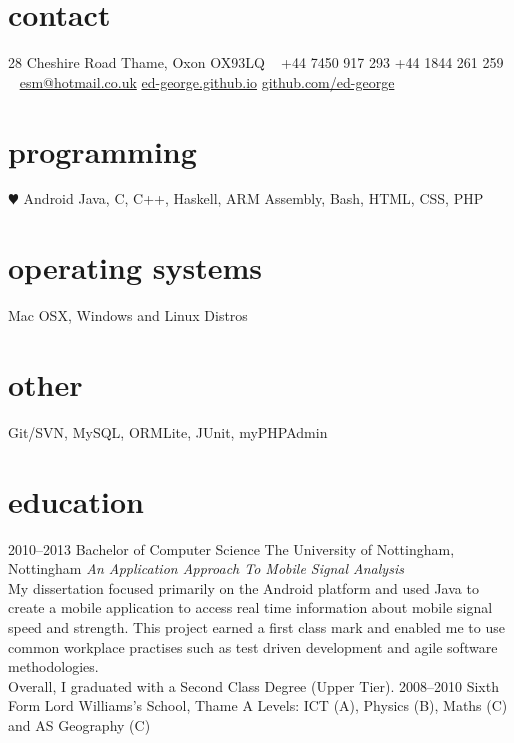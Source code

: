 \documentclass[]{friggeri-cv} %
\begin{document}


\begin{aside} %
\section{contact}
28 Cheshire Road
Thame, Oxon
OX93LQ
~
+44 7450 917 293
+44 1844 261 259
~
\href{mailto:esm@hotmail.co.uk}{esm@hotmail.co.uk}
\href{http://ed-george.github.io}{ed-george.github.io}
\href{http://github.com/ed-george}{github.com/ed-george}
\section{programming}
{\color{red} $\varheartsuit$} Android
Java, C, C++, Haskell, ARM Assembly, Bash, HTML, CSS, PHP
\section{operating systems}
Mac OSX, Windows and Linux Distros
\section{other}
Git/SVN, MySQL, ORMLite, JUnit, myPHPAdmin
\end{aside}


\section{education}

\begin{entrylist}
\entry
{2010--2013}
{Bachelor {\normalfont of Computer Science}}
{The University of Nottingham, Nottingham}
{\emph{An Application Approach To Mobile Signal Analysis} \\ My dissertation focused primarily on the Android platform and used Java to create a mobile application to access real time information about mobile signal speed and strength. This project earned a first class mark and enabled me to use common workplace practises such as test driven development and agile software methodologies.\\Overall, I graduated with a Second Class Degree (Upper Tier).}
\entry
{2008--2010}
{Sixth Form}
{Lord Williams's School, Thame}
{A Levels: ICT (A), Physics (B), Maths (C) and AS Geography (C)}
\end{entrylist}
\end{document}
